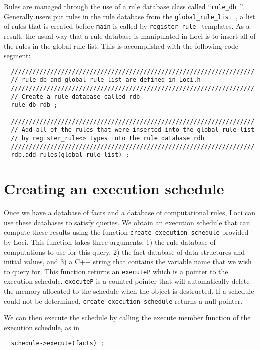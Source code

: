 \documentclass[10pt,epsf]{book}
\begin{document}
Rules are managed through the use of a rule database class called
``{\tt rule\_db }''.  Generally users put rules in the rule database
from the {\tt global\_rule\_list }, a list of rules that is created
before {\tt main} is called by {\tt register\_rule } templates.  As a
result, the usual way that a rule database is manipulated in Loci is
to insert all of the rules in the global rule list.  This is
accomplished with the following code segment: 

\begin{verbatim}
  ////////////////////////////////////////////////////////////////////
  // rule_db and global_rule_list are defined in Loci.h
  ////////////////////////////////////////////////////////////////////
  // Create a rule database called rdb
  rule_db rdb ;

  ////////////////////////////////////////////////////////////////////
  // Add all of the rules that were inserted into the global_rule_list
  // by register_rule<> types into the rule database rdb
  ////////////////////////////////////////////////////////////////////
  rdb.add_rules(global_rule_list) ;
\end{verbatim}

\section{Creating an execution schedule}

Once we have a database of facts and a database of computational
rules, Loci can use these databases to satisfy queries.  We obtain an
execution schedule that can compute these results using the function
{\tt create\_execution\_schedule} provided by Loci.  This function
takes three arguments, 1) the rule database of computations to use for
this query, 2) the fact database of data structures and initial
values, and 3) a C++ string that contains the variable name that we
wish to query for.  This function returns an {\tt executeP} which is a
pointer to the execution schedule.  {\tt executeP} is a counted
pointer that will automatically delete the memory allocated to the
schedule when the object is destructed.  If a schedule could not be
determined, {\tt create\_execution\_schedule} returns a null pointer.  

We can then execute the schedule by calling the execute member
function of the execution schedule, as in
\begin{verbatim}
  schedule->execute(facts) ;
\end{verbatim}
\end{document}
